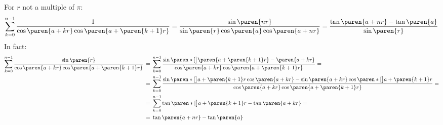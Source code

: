 For $r$ not a multiple of $\pi$:
\begin{equation*}
  \sum\limits_{k = 0}^{n - 1} {\frac{1}{\cos\paren{a + k r} \cos\paren{a + \paren{k+1} r}}}
  = \frac{\sin\paren{n r}}{\sin\paren{r} \cos\paren{a} \cos\paren{a + n r}}
  = \frac{\tan\paren{a + n r} - \tan\paren{a}}{\sin\paren{r}}
\end{equation*}
In fact:
\begin{align*}
 \sum\limits_{k = 0}^{n - 1} {\frac{\sin\paren{r}}{\cos\paren{a + k r} \cos\paren{a + \paren{k+1} r}}} \,
 &= \, \sum\limits_{k = 0}^{n - 1} {\frac{\sin\paren*[\big]{\paren{a + \paren{k+1} r} - \paren{a + k r}}}
                                         {\cos\paren{a + k r} \cos\paren{a + \paren{k+1} r}}} = \\
 &= \, \sum\limits_{k = 0}^{n - 1} {\frac{\sin\paren*[\big]{a + \paren{k + 1} r} \cos\paren{a + k r}
                                          - \sin\paren{a + k r} \cos\paren*[\big]{a + \paren{k + 1} r}}
                                         {\cos\paren{a + k r} \cos\paren{a + \paren{k+1} r}}} = \\
 &= \, \sum\limits_{k = 0}^{n - 1} {\tan\paren*[\big]{a + \paren{k + 1} r} - \tan\paren{a + k r}} = \\
 &= \, \tan\paren{a + n r} - \tan\paren{a}
\end{align*}
